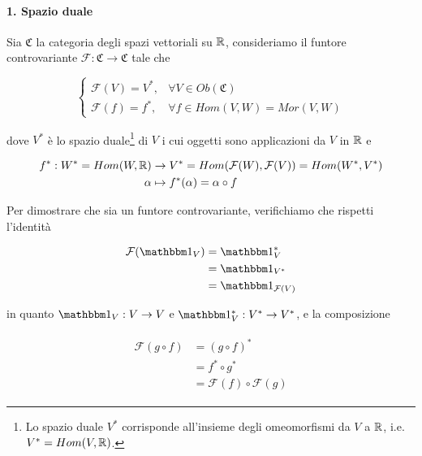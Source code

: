 \paragraph{1. Spazio duale}

Sia $ \mathfrak{C} $ la categoria degli spazi vettoriali su $ \mathbb{R} $, consideriamo il funtore controvariante $ \mathcal{F} : \mathfrak{C} \to \mathfrak{C} $ tale che

\begin{equation}
	\begin{cases}
		\mathcal{F}(V) = V^{*}, & \forall V \in Ob(\mathfrak{C})\\
		\mathcal{F}(f) = f^{*}, & \forall f \in Hom(V,W) = Mor(V,W)
	\end{cases}
\end{equation}

dove $ V^{*} $ è lo spazio duale\footnote{%
	Lo spazio duale $ V^{*} $ corrisponde all'insieme degli omeomorfismi da $ V $ a $ \mathbb{R} $, i.e. $ V^{*} = Hom(V,\mathbb{R}) $.%
} di $ V $ i cui oggetti sono applicazioni da $ V $ in $ \mathbb{R} $ e

\begin{align}
	\begin{split}
		f^{*} : W^{*} = Hom(W,\mathbb{R}) &\to V^{*} = Hom(\mathcal{F}(W),\mathcal{F}(V)) = Hom(W^{*},V^{*})\\
		\alpha &\mapsto f^{*}(\alpha) = \alpha \circ f
	\end{split}
\end{align}

Per dimostrare che sia un funtore controvariante, verifichiamo che rispetti l'identità

\begin{align}
	\begin{split}
		\mathcal{F}(\bigone_{V}) &= \bigone_{V}^{*}\\
		&= \bigone_{V^{*}}\\
		&= \bigone_{\mathcal{F}(V)}
	\end{split}
\end{align}

in quanto $ \bigone_{V} : V \to V $ e $ \bigone_{V}^{*} : V^{*} \to V^{*} $, e la composizione

\begin{align}
	\begin{split}
		\mathcal{F}(g \circ f) &= (g \circ f)^{*}\\
		&= f^{*} \circ g^{*}\\
		&= \mathcal{F}(f) \circ \mathcal{F}(g)
	\end{split}
\end{align}

